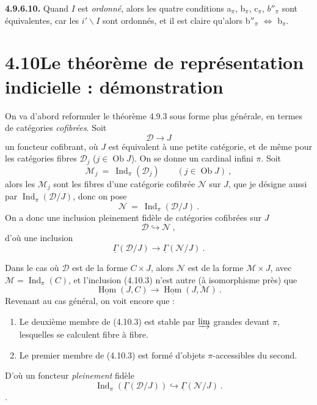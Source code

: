 \documentclass[11pt]{article}
\newcommand{\msp}[1]{\marginpar{\footnotesize [#1]}}
\newcommand{\uGamma}{\underline{\Gamma}}
\newcommand{\Ind}{\operatorname{Ind}}
\newcommand{\Ob}{\operatorname{Ob}}
\begin{document}
\textbf{4.9.6.10.} Quand $I$ est \textit{ordonné}, alors les quatre conditions a$_\pi$, b$_\pi$, c$_\pi$, $b''_\pi$ sont équivalentes, car les $i'\backslash I$ sont ordonnés, et il est claire qu'alors b$''_\pi$ $\Longleftrightarrow$ b$_\pi$. %

\msp{page 243}

\section*{4.10\quad Le théorème de représentation indicielle : démonstration}

On va d'abord reformuler le théorème 4.9.3 sous forme plus générale, en termes de catégories \textit{cofibrées}. Soit
\[
\mathcal{D} \longrightarrow J \tag*{(4.10.1)}
\]
un foncteur cofibrant, où $J$ est équivalent à une petite catégorie, et de même pour les catégories fibres $\mathcal{D}_j$ ($j \in \Ob J$). On se donne un cardinal infini $\pi$. Soit
\[
\mathcal{M}_j \ = \ \Ind_\pi(\mathcal{D}_j) \qquad (j \in \Ob J) \ , \tag*{(4.10.2)}
\]
alors les $\mathcal{M}_j$ sont les fibres d'une catégorie cofibrée $\mathcal{N}$ sur $J$, que je désigne aussi par $\Ind_\pi(\mathcal{D}/J)$, donc on pose
\[
\mathcal{N} \ = \ \Ind_\pi(\mathcal{D}/J) \ . \tag*{(4.10.3)}
\]
On a donc une inclusion pleinement fidèle de catégories cofibrées sur $J$
\[
\mathcal{D} \hookrightarrow \mathcal{N} \ ,
\]
d'où une inclusion
\[
\uGamma(\mathcal{D}/J) \longrightarrow \uGamma(\mathcal{N}/J) \ . \tag*{(4.10.4)}
\]

\msp{page 244}
Dans le cas où $\mathcal{D}$ est de la forme $C \times J$, alors $\mathcal{N}$ est de la forme $\mathcal{M} \times J$, avec $\mathcal{M} = \Ind_\pi(C)$, et l'inclusion (4.10.3) n'est autre (à isomorphisme près) que
\[
\underline{\operatorname{Hom}}(J, C) \longrightarrow \underline{\operatorname{Hom}}(J, \mathcal{M}) \ .
\]
Revenant au cas général, on voit encore que :
\begin{enumerate}[label={}, leftmargin=3em]
\item[1°)] Le deuxième membre de (4.10.3) est stable par $\varinjlim$ grandes devant $\pi$, lesquelles se calculent fibre à fibre.
\item[2°)] Le premier membre de (4.10.3) est formé d'objets $\pi$-accessibles du second.
\end{enumerate}
D'où un foncteur \textit{pleinement} fidèle
\[
\Ind_\pi(\uGamma(\mathcal{D}/J)) \hookrightarrow \uGamma(\mathcal{N}/J) \ . \tag*{(4.10.4)}
\]
\setcounter{footnote}{103}%
.
\end{document}
